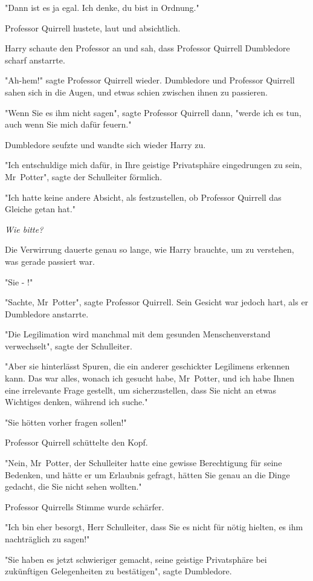 {"Dann ist es ja egal. Ich denke, du bist in Ordnung."

Professor Quirrell hustete, laut und absichtlich.

Harry schaute den Professor an und sah, dass Professor Quirrell Dumbledore scharf anstarrte.

"Ah-hem!" sagte Professor Quirrell wieder. Dumbledore und Professor Quirrell sahen sich in die Augen, und etwas schien zwischen ihnen zu passieren.

"Wenn Sie es ihm nicht sagen", sagte Professor Quirrell dann, "werde ich es tun, auch wenn Sie mich dafür feuern."

Dumbledore seufzte und wandte sich wieder Harry zu.

"Ich entschuldige mich dafür, in Ihre geistige Privatsphäre eingedrungen zu sein, Mr~Potter", sagte der Schulleiter förmlich.

"Ich hatte keine andere Absicht, als festzustellen, ob Professor Quirrell das Gleiche getan hat."

\emph{Wie bitte?}

Die Verwirrung dauerte genau so lange, wie Harry brauchte, um zu verstehen, was gerade passiert war.

"Sie - !"

"Sachte, Mr~Potter", sagte Professor Quirrell. Sein Gesicht war jedoch hart, als er Dumbledore anstarrte.

"Die Legilimation wird manchmal mit dem gesunden Menschenverstand verwechselt", sagte der Schulleiter.

"Aber sie hinterlässt Spuren, die ein anderer geschickter Legilimens erkennen kann. Das war alles, wonach ich gesucht habe, Mr~Potter, und ich habe Ihnen eine irrelevante Frage gestellt, um sicherzustellen, dass Sie nicht an etwas Wichtiges denken, während ich suche."

"Sie hötten vorher fragen sollen!"

Professor Quirrell schüttelte den Kopf.

"Nein, Mr~Potter, der Schulleiter hatte eine gewisse Berechtigung für seine Bedenken, und hätte er um Erlaubnis gefragt, hätten Sie genau an die Dinge gedacht, die Sie nicht sehen wollten."

Professor Quirrells Stimme wurde schärfer.

"Ich bin eher besorgt, Herr Schulleiter, dass Sie es nicht für nötig hielten, es ihm nachträglich zu sagen!"

"Sie haben es jetzt schwieriger gemacht, seine geistige Privatsphäre bei zukünftigen Gelegenheiten zu bestätigen", sagte Dumbledore.

}
